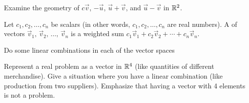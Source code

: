 \begin{problemtodo}
  Examine the geometry of $c\vec v$, $-\vec u$, $\vec u + \vec v$, and $\vec
  u-\vec v$ in $\mathbb{R}^2$.
\end{problemtodo}

\begin{definition}
  Let $c_1,c_2,\ldots,c_n$ be scalars (in other words,
  $c_1,c_2,\ldots,c_n$ are real numbers).  A  of vectors $\vec v_1,\, \vec v_2,\, \ldots,\, \vec
  v_n$ is a weighted sum $c_1\vec v_1+c_2\vec v_2+\cdots+c_n\vec v_n$.
\end{definition}

\begin{problemtodo}
  Do some linear combinations in each of the vector spaces
\end{problemtodo}

\begin{problemtodo}
  Represent a real problem as a vector in $\mathbb{R}^4$ (like quantities of
  different merchandise).  Give a situation where you have a linear
  combination (like production from two suppliers).  Emphasize that
  having a vector with 4 elements is not a problem.
\end{problemtodo}


